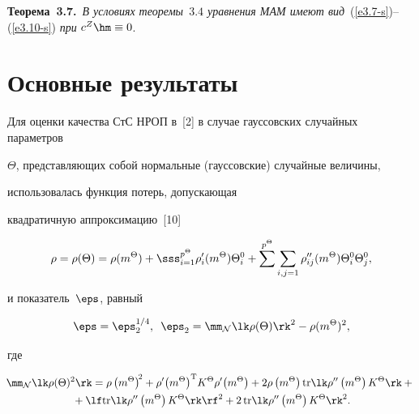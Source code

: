\smallskip



\noindent

\textbf{Теорема~3.7.}\ \textit{В условиях теоремы~$3.4$ уравнения МАМ имеют вид}~(\ref{e3.7-s})--(\ref{e3.10-s}) \textit{при} $c^Z\hm\equiv 0$.











\section{Основные результаты }



Для оценки качества СтС НРОП в~[2] в случае гауссовских случайных параметров 

$\Theta$, представляющих собой нормальные (гауссовские) случайные величины, 

использовалась функция потерь, допускающая

квадратичную аппроксимацию~[10]

\begin{equation}

\rho = \rho(\Theta) = \rho (m^\Theta) + \sss_{i=1}^{p^\Theta} \rho_i' 

(m^\Theta) \Theta_i^0 + \sum\limits^{p^\Theta}\sum\limits_{i, j =1} \rho_{ij}'' (m^\Theta )\Theta_i^0\Theta_j^0, \label{e4.1-s}

\end{equation}

и показатель~$\eps$, равный

    \begin{equation}

    \eps = \eps_2^{1/4},\enskip \eps_2 =\mm_{\cal N} \lk \rho (\Theta)\rk^2 - 

\rho (m^\Theta)^2,\label{e4.2-s}

\end{equation}

где

\begin{multline}

\!\mm_{\mathcal{N}} \lk \rho(\Theta)^2\rk = \rho \left(m^\Theta\right)^{\!2} + \rho' \!

\left(m^\Theta\right)^{\mathrm{T}} \!K^\Theta \rho' \! \left(m^\Theta\right) + 2 \rho \left(m^\Theta\right) \mathrm{tr} \lk \rho'' 

\left(m^\Theta\right) K^\Theta\rk +{}\\

{}+ \lf \mathrm{tr} \lk \rho '' \left(m^\Theta\right) K^\Theta\rk \rf^2 + 2\,\mathrm{tr} \lk 

\rho'' \left(m^\Theta\right) K^\Theta\rk^2.

\label{e4.3-s}

\end{multline}



